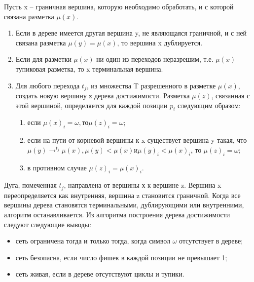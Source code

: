 Пусть x – граничная вершина, которую необходимо обработать, и с которой связана разметка $ \mu(x) $.
\begin{enumerate}
\item Если в дереве имеется другая вершина y, не являющаяся граничной, и с ней связана разметка $ \mu(y) = \mu(x) $, то вершина x дублируется. 
\item Если для разметки $ \mu(x) $ ни один из переходов неразрешим, т.е. $ \mu(x) $ тупиковая разметка, то x терминальная вершина.
\item Для любого перехода $ t_{j} $, из множества T разрешенного в разметке $ \mu(x) $, создать новую вершину z дерева достижимости. Разметка $ \mu(z) $, связанная с этой вершиной, определяется для каждой позиции $ p_{i} $ следующим образом:
\begin{enumerate}
\item если $ \mu(x)_{i} = \omega, то \mu(z)_{i} = \omega $;
\item если на пути от корневой вершины к x существует вершина y такая, что $ \mu(y)\rightarrow^{t_{j}} \mu(x), \mu(y) < \mu(x) и \mu(y)_{i} < \mu(x)_{i} $, то $ \mu(z)_{i} = \omega $;
\item в противном случае $ \mu(z)_{i} = \mu(x)_{i} $.
\end{enumerate}

\end{enumerate}

Дуга, помеченная $ t_{j} $, направлена от вершины х к вершине z. Вершина x переопределяется как внутренняя, вершина z становится граничной. Когда все вершины дерева становятся терминальными, дублирующими или внутренними, алгоритм останавливается. Из алгоритма построения дерева достижимости следуют следующие выводы:
\begin{itemize}
\item сеть ограничена тогда и только тогда, когда символ $ \omega $ отсутствует в дереве;
\item сеть безопасна, если число фишек в каждой позиции не превышает 1;
\item сеть живая, если в дереве отсутствуют циклы и тупики.
\end{itemize}

\label{cha:design}